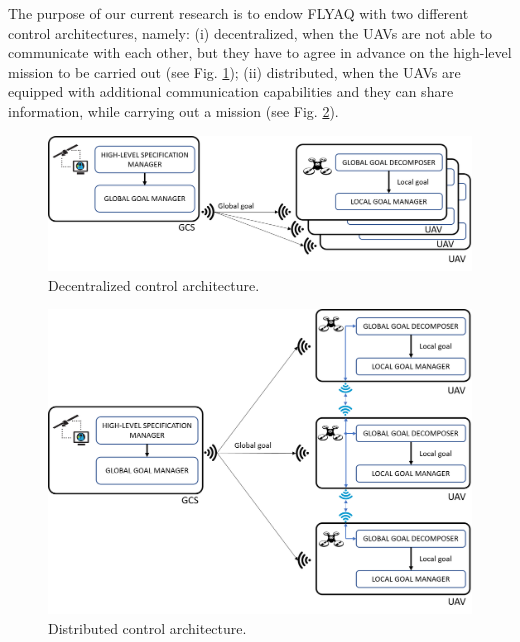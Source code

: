 \documentclass[letterpaper, 10 pt, conference]{ieeeconf}
\begin{document}
The purpose of our current research is to endow FLYAQ with two different control architectures, namely: (i) decentralized, when the UAVs are not able to communicate with each other, but they have to agree in advance on the high-level mission to be carried out (see Fig. \ref{fig:decentralized-architecture}); (ii) distributed, when the UAVs are equipped with additional communication capabilities and they can share information, while carrying out a mission (see Fig. \ref{fig:distributed-architecture}).
%
\begin{figure}
	\centering
	\includegraphics[width=0.9\linewidth]{"fig/decentralized architecture"}
				\vspace*{-0.4cm}
	\caption{Decentralized control architecture.}
	\label{fig:decentralized-architecture}
			\vspace*{-0.3cm}
\end{figure}
%
\begin{figure}
	\centering
	\includegraphics[width=0.9\linewidth]{"fig/distributed2"}
					\vspace*{-0.4cm}
	\caption{Distributed control architecture.}
	\label{fig:distributed-architecture}
			\vspace*{-0.6cm}
\end{figure}
\end{document}
